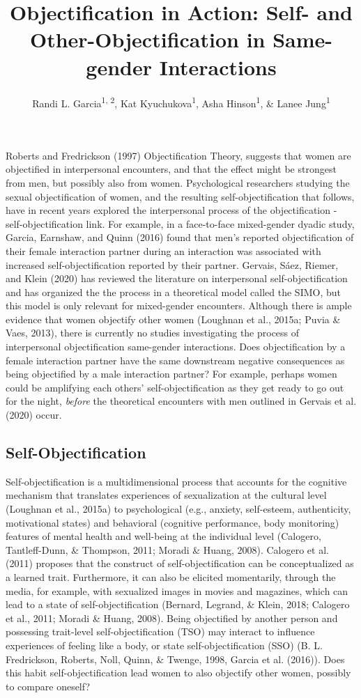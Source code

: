\documentclass[man]{apa6}
\title{Objectification in Action: Self- and Other-Objectification in
Same-gender Interactions}
\author{Randi L. Garcia\textsuperscript{1, 2}, Kat
Kyuchukova\textsuperscript{1}, Asha Hinson\textsuperscript{1}, \& Lanee
Jung\textsuperscript{1}}
\date{}
\affiliation{
\vspace{0.5cm}
\textsuperscript{1} Department of Psychology, Smith College\\\textsuperscript{2} Program in Statistical and Data Sciences, Smith College}
\begin{document}
\maketitle

Roberts and Fredrickson (1997) Objectification Theory, suggests that
women are objectified in interpersonal encounters, and that the effect
might be strongest from men, but possibly also from women. Psychological
researchers studying the sexual objectification of women, and the
resulting self-objectification that follows, have in recent years
explored the interpersonal process of the objectification -
self-objectification link. For example, in a face-to-face mixed-gender
dyadic study, Garcia, Earnshaw, and Quinn (2016) found that men's
reported objectification of their female interaction partner during an
interaction was associated with increased self-objectification reported
by their partner. Gervais, Sáez, Riemer, and Klein (2020) has reviewed
the literature on interpersonal self-objectification and has organized
the the process in a theoretical model called the SIMO, but this model
is only relevant for mixed-gender encounters. Although there is ample
evidence that women objectify other women (Loughnan et al., 2015a; Puvia
\& Vaes, 2013), there is currently no studies investigating the process
of interpersonal objectification same-gender interactions. Does
objectification by a female interaction partner have the same downstream
negative consequences as being objectified by a male interaction
partner? For example, perhaps women could be amplifying each others'
self-objectification as they get ready to go out for the night,
\emph{before} the theoretical encounters with men outlined in Gervais et
al. (2020) occur.

\subsection{Self-Objectification}\label{self-objectification}

Self-objectification is a multidimensional process that accounts for the
cognitive mechanism that translates experiences of sexualization at the
cultural level (Loughnan et al., 2015a) to psychological (e.g., anxiety,
self-esteem, authenticity, motivational states) and behavioral
(cognitive performance, body monitoring) features of mental health and
well-being at the individual level (Calogero, Tantleff-Dunn, \&
Thompson, 2011; Moradi \& Huang, 2008). Calogero et al. (2011) proposes
that the construct of self-objectification can be conceptualized as a
learned trait. Furthermore, it can also be elicited momentarily, through
the media, for example, with sexualized images in movies and magazines,
which can lead to a state of self-objectification (Bernard, Legrand, \&
Klein, 2018; Calogero et al., 2011; Moradi \& Huang, 2008). Being
objectified by another person and possessing trait-level
self-objectification (TSO) may interact to influence experiences of
feeling like a body, or state self-objectification (SSO) (B. L.
Fredrickson, Roberts, Noll, Quinn, \& Twenge, 1998, Garcia et al.
(2016)). Does this habit self-objectification lead women to also
objectify other women, possibly to compare oneself?
\end{document}

